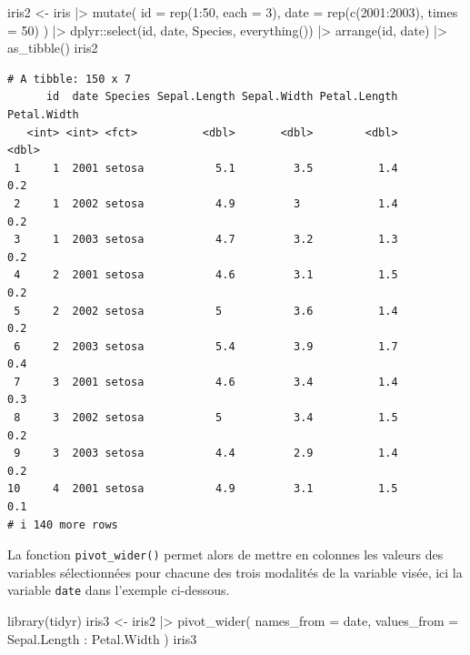 \documentclass[
  letterpaper,
]{book}
\newenvironment{Shaded}{\begin{snugshade}}{\end{snugshade}}
\newcommand{\AttributeTok}[1]{\textcolor[rgb]{0.40,0.45,0.13}{#1}}
\newcommand{\DecValTok}[1]{\textcolor[rgb]{0.68,0.00,0.00}{#1}}
\newcommand{\FunctionTok}[1]{\textcolor[rgb]{0.28,0.35,0.67}{#1}}
\newcommand{\NormalTok}[1]{\textcolor[rgb]{0.00,0.23,0.31}{#1}}
\newcommand{\OtherTok}[1]{\textcolor[rgb]{0.00,0.23,0.31}{#1}}
\newcommand{\SpecialCharTok}[1]{\textcolor[rgb]{0.37,0.37,0.37}{#1}}
\begin{document}
\begin{Shaded}
\begin{Highlighting}[]
\NormalTok{iris2 }\OtherTok{\textless{}{-}}
\NormalTok{  iris }\SpecialCharTok{|\textgreater{}}
  \FunctionTok{mutate}\NormalTok{(}
    \AttributeTok{id =} \FunctionTok{rep}\NormalTok{(}\DecValTok{1}\SpecialCharTok{:}\DecValTok{50}\NormalTok{, }\AttributeTok{each =} \DecValTok{3}\NormalTok{),}
    \AttributeTok{date =} \FunctionTok{rep}\NormalTok{(}\FunctionTok{c}\NormalTok{(}\DecValTok{2001}\SpecialCharTok{:}\DecValTok{2003}\NormalTok{), }\AttributeTok{times =} \DecValTok{50}\NormalTok{)}
\NormalTok{    ) }\SpecialCharTok{|\textgreater{}}
\NormalTok{  dplyr}\SpecialCharTok{::}\FunctionTok{select}\NormalTok{(id, date, Species,  }\FunctionTok{everything}\NormalTok{()) }\SpecialCharTok{|\textgreater{}}
  \FunctionTok{arrange}\NormalTok{(id, date) }\SpecialCharTok{|\textgreater{}}
  \FunctionTok{as\_tibble}\NormalTok{()}
\NormalTok{iris2}
\end{Highlighting}
\end{Shaded}

\begin{verbatim}
# A tibble: 150 x 7
      id  date Species Sepal.Length Sepal.Width Petal.Length Petal.Width
   <int> <int> <fct>          <dbl>       <dbl>        <dbl>       <dbl>
 1     1  2001 setosa           5.1         3.5          1.4         0.2
 2     1  2002 setosa           4.9         3            1.4         0.2
 3     1  2003 setosa           4.7         3.2          1.3         0.2
 4     2  2001 setosa           4.6         3.1          1.5         0.2
 5     2  2002 setosa           5           3.6          1.4         0.2
 6     2  2003 setosa           5.4         3.9          1.7         0.4
 7     3  2001 setosa           4.6         3.4          1.4         0.3
 8     3  2002 setosa           5           3.4          1.5         0.2
 9     3  2003 setosa           4.4         2.9          1.4         0.2
10     4  2001 setosa           4.9         3.1          1.5         0.1
# i 140 more rows
\end{verbatim}

La fonction \texttt{pivot\_wider()} permet alors de mettre en colonnes
les valeurs des variables sélectionnées pour chacune des trois modalités
de la variable visée, ici la variable \texttt{date} dans l'exemple
ci-dessous.

\begin{Shaded}
\begin{Highlighting}[]
\FunctionTok{library}\NormalTok{(tidyr)}
\NormalTok{iris3 }\OtherTok{\textless{}{-}} 
\NormalTok{  iris2 }\SpecialCharTok{|\textgreater{}} 
  \FunctionTok{pivot\_wider}\NormalTok{(}
    \AttributeTok{names\_from =}\NormalTok{ date,}
    \AttributeTok{values\_from =}\NormalTok{ Sepal.Length }\SpecialCharTok{:}\NormalTok{ Petal.Width}
\NormalTok{    )}
\NormalTok{iris3}
\end{Highlighting}
\end{Shaded}
\end{document}
